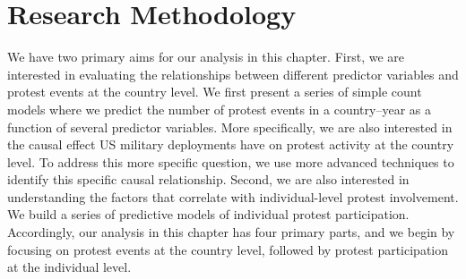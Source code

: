 		
		
		
		
		
		\section*{Research Methodology}
		
		We have two primary aims for our analysis in this chapter. First, we are interested in evaluating the relationships between different predictor variables and protest events at the country level. We first present a series of simple count models where we predict the number of protest events in a country--year as a function of several predictor variables. More specifically, we are also interested in the causal effect US military deployments have on protest activity at the country level. To address this more specific question, we use more advanced techniques to identify this specific causal relationship. Second, we are also interested in understanding the factors that correlate with individual-level protest involvement. We build a series of predictive models of individual protest participation. Accordingly, our analysis in this chapter has four primary parts, and we begin by focusing on protest events at the country level, followed by protest participation at the individual level. 
		
